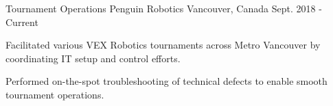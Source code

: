 

\begin{cventries}

  \cventry
    {Tournament Operations} %
    {Penguin Robotics} %
    {Vancouver, Canada} %
    {Sept. 2018 - Current} %
    {
      \begin{cvitems} %
        \item {Facilitated various VEX Robotics tournaments across Metro Vancouver by coordinating IT setup and control efforts.}
        \item {Performed on-the-spot troubleshooting of technical defects to enable smooth tournament operations.}
      \end{cvitems}
    }

\end{cventries}
